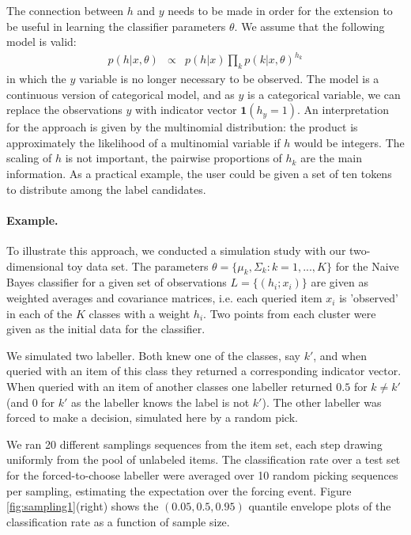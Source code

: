 \documentclass[10pt, onecolumn]{article}
\begin{document}
The connection between $h$ and $y$ needs to be made in order for the
extension to be useful in learning the classifier parameters
$\theta$. We assume that the following model is valid: 
\begin{eqnarray}
\label{eq:ph}
p(h|x, \theta)&\propto&p(h|x) \prod_k p(k|x, \theta)^{h_k}
\end{eqnarray}
in which the $y$ variable is no longer necessary to be observed. The
model is a continuous version of  categorical model, and as $y$ is a
categorical variable, we can replace the observations $y$ with
indicator vector $\mathbf{1}(h_y=1)$. An interpretation for the
approach is given by the multinomial distribution: the product is
approximately the likelihood of a multinomial variable if $h$ would be
integers. The scaling of $h$ is not important, the pairwise
proportions of $h_k$ are the main information. As a practical example,
the user could be given a set of ten tokens to distribute among the
label candidates.


\paragraph{Example.} To illustrate this approach, we
conducted a simulation study with our two-dimensional toy data
set. The parameters $\theta=\{\mu_k, \Sigma_k: k=1,...,K\}$ for the
Naive Bayes classifier for a given set of observations
$L=\{(h_i;x_i)\}$ are given as weighted averages and covariance
matrices, i.e. each queried item $x_i$ is 'observed' in each of the
$K$ classes with a weight $h_i$. Two points from each cluster were
given as the initial data for the classifier.

We simulated two labeller. Both knew one of the classes, say $k'$, and
when queried with an item of this class they returned a corresponding
indicator vector. When queried with an item of another classes one
labeller returned $0.5$ for $k\neq k'$ (and 0 for $k'$ as the labeller
knows the label is not $k'$). The other labeller was forced to make a
decision, simulated here by a random pick.
 
We ran 20 different samplings sequences from the item set, each step
drawing uniformly from the pool of unlabeled items. The classification
rate over a test set for the forced-to-choose labeller were averaged
over 10 random picking sequences per sampling, estimating the
expectation over the forcing event. Figure \ref{fig:sampling1}(right)
shows the $(0.05, 0.5, 0.95)$ quantile envelope plots of the
classification rate as a function of sample size.
  
\end{document}

